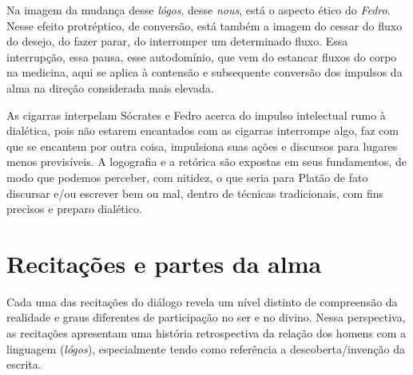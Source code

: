 Na imagem da mudança desse \emph{lógos}, desse \emph{nous}, está o
aspecto ético do \emph{Fedro}. Nesse efeito protréptico, de conversão,
está também a imagem do cessar do fluxo do desejo, do fazer parar, do
interromper um determinado fluxo. Essa interrupção, essa pausa, esse
autodomínio, que vem do estancar fluxos do corpo na medicina, aqui se
aplica à contensão e subsequente conversão dos impulsos da alma na
direção considerada mais elevada.

As cigarras interpelam Sócrates e Fedro acerca do impulso intelectual
rumo à dialética, pois não estarem encantados com as cigarras interrompe
algo, faz com que se encantem por outra coisa, impulsiona suas ações e
discursos para lugares menos previsíveis. A logografia e a retórica são
expostas em seus fundamentos, de modo que podemos perceber, com nitidez,
o que seria para Platão de fato discursar e/\allowbreak{}ou escrever bem ou mal,
dentro de técnicas tradicionais, com fins precisos e preparo dialético.

 

\section{Recitações e partes da alma}
	

Cada uma das recitações do diálogo revela um nível distinto de
compreensão da realidade e graus diferentes de participação no ser e no
divino. Nessa perspectiva, as recitações apresentam uma história
retrospectiva da relação dos homens com a linguagem (\emph{lógos}),
especialmente tendo como referência a descoberta/\allowbreak{}invenção da escrita.

